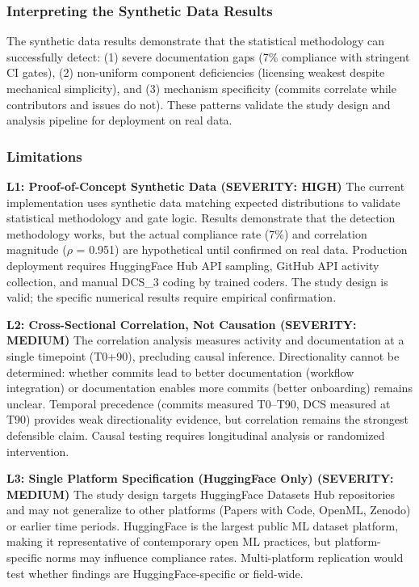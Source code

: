 
\subsubsection{Interpreting the Synthetic Data Results}

The synthetic data results demonstrate that the statistical methodology can successfully detect: (1) severe documentation gaps (7\% compliance with stringent CI gates), (2) non-uniform component deficiencies (licensing weakest despite mechanical simplicity), and (3) mechanism specificity (commits correlate while contributors and issues do not). These patterns validate the study design and analysis pipeline for deployment on real data.

\subsubsection{Limitations}

\textbf{L1: Proof-of-Concept Synthetic Data (SEVERITY: HIGH)}  
The current implementation uses synthetic data matching expected distributions to validate statistical methodology and gate logic. Results demonstrate that the detection methodology works, but the actual compliance rate (7\%) and correlation magnitude ($\rho$ = 0.951) are hypothetical until confirmed on real data. Production deployment requires HuggingFace Hub API sampling, GitHub API activity collection, and manual DCS\_3 coding by trained coders. The study design is valid; the specific numerical results require empirical confirmation.

\textbf{L2: Cross-Sectional Correlation, Not Causation (SEVERITY: MEDIUM)}  
The correlation analysis measures activity and documentation at a single timepoint (T0+90), precluding causal inference. Directionality cannot be determined: whether commits lead to better documentation (workflow integration) or documentation enables more commits (better onboarding) remains unclear. Temporal precedence (commits measured T0--T90, DCS measured at T90) provides weak directionality evidence, but correlation remains the strongest defensible claim. Causal testing requires longitudinal analysis or randomized intervention.

\textbf{L3: Single Platform Specification (HuggingFace Only) (SEVERITY: MEDIUM)}  
The study design targets HuggingFace Datasets Hub repositories and may not generalize to other platforms (Papers with Code, OpenML, Zenodo) or earlier time periods. HuggingFace is the largest public ML dataset platform, making it representative of contemporary open ML practices, but platform-specific norms may influence compliance rates. Multi-platform replication would test whether findings are HuggingFace-specific or field-wide.

